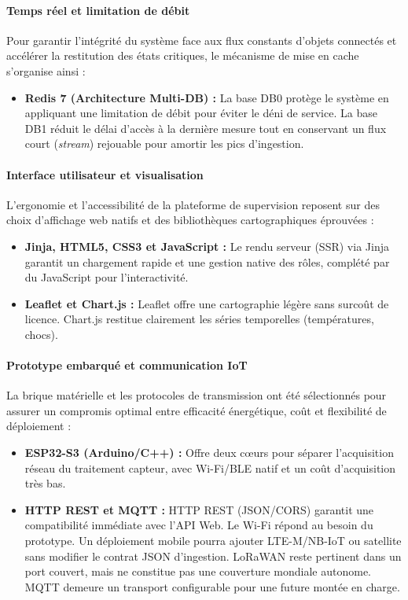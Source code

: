 \paragraph{Temps réel et limitation de débit}
Pour garantir l'intégrité du système face aux flux constants d'objets connectés et accélérer la restitution des états critiques, le mécanisme de mise en cache s'organise ainsi :
\begin{itemize}
    \item \textbf{Redis 7 (Architecture Multi-DB) :} La base DB0 protège le système en appliquant une limitation de débit pour éviter le déni de service. La base DB1 réduit le délai d'accès à la dernière mesure tout en conservant un flux court (\emph{stream}) rejouable pour amortir les pics d'ingestion.
\end{itemize}

\paragraph{Interface utilisateur et visualisation}
L'ergonomie et l'accessibilité de la plateforme de supervision reposent sur des choix d'affichage web natifs et des bibliothèques cartographiques éprouvées :
\begin{itemize}
    \item \textbf{Jinja, HTML5, CSS3 et JavaScript :} Le rendu serveur (SSR) via Jinja garantit un chargement rapide et une gestion native des rôles, complété par du JavaScript pour l'interactivité.
    \item \textbf{Leaflet et Chart.js :} Leaflet offre une cartographie légère sans surcoût de licence. Chart.js restitue clairement les séries temporelles (températures, chocs)\cite{leaflet,chartjs}.
\end{itemize}

\paragraph{Prototype embarqué et communication IoT}
La brique matérielle et les protocoles de transmission ont été sélectionnés pour assurer un compromis optimal entre efficacité énergétique, coût et flexibilité de déploiement :
\begin{itemize}
    \item \textbf{ESP32-S3 (Arduino/C++) :} Offre deux cœurs pour séparer l'acquisition réseau du traitement capteur, avec Wi-Fi/BLE natif et un coût d'acquisition très bas\cite{esp32}.
    \item \textbf{HTTP REST et MQTT :} HTTP REST (JSON/CORS) garantit une compatibilité immédiate avec l'API Web. Le Wi-Fi répond au besoin du prototype. Un déploiement mobile pourra ajouter LTE-M/NB-IoT ou satellite sans modifier le contrat JSON d'ingestion. LoRaWAN reste pertinent dans un port couvert, mais ne constitue pas une couverture mondiale autonome. MQTT demeure un transport configurable pour une future montée en charge.
\end{itemize}

